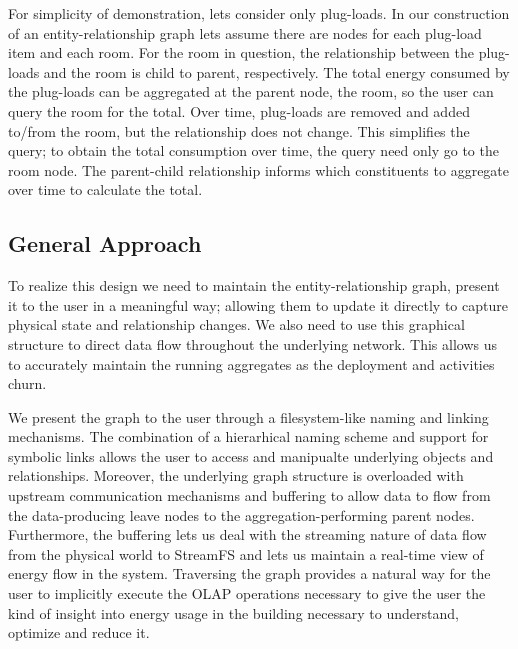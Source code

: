 For simplicity of demonstration, lets consider only plug-loads.  In our construction of an entity-relationship
graph lets assume there are nodes for each plug-load item and each room.  For the room in question, the relationship
between the plug-loads and the room is child to parent, respectively.  The total energy consumed by
the plug-loads can be aggregated at the parent node, the room, so the user can query the room for
the total.  Over time, plug-loads are removed and added to/from the room, but the relationship does not
change.  This simplifies the query; to obtain the total consumption over time, the query need only
go to the room node.  The parent-child relationship informs which constituents to aggregate over time
to calculate the total.

\subsection{General Approach}
To realize this design we need to maintain the entity-relationship graph, present it to the user in a meaningful
way; allowing them to update it directly to capture physical state and relationship changes.  We also need to
use this graphical structure to direct data flow throughout the underlying network.  This allows us
to accurately maintain the running aggregates as the deployment and activities churn.

We present the graph to the user through a filesystem-like naming and linking mechanisms.  The combination of a
hierarhical naming scheme and support for symbolic links allows the user to access and manipualte underlying objects
and relationships.  Moreover, the underlying graph structure is overloaded with upstream communication mechanisms
and buffering to allow data to flow from the data-producing leave nodes to the aggregation-performing
parent nodes.  Furthermore, the buffering lets us deal with the streaming nature of data flow from the physical
world to StreamFS and lets us maintain a real-time view of energy flow in the system.
Traversing the graph provides a natural way for the user to implicitly execute the OLAP operations necessary 
to give the user the kind of insight into energy usage in the building necessary to understand, optimize and 
reduce it.



